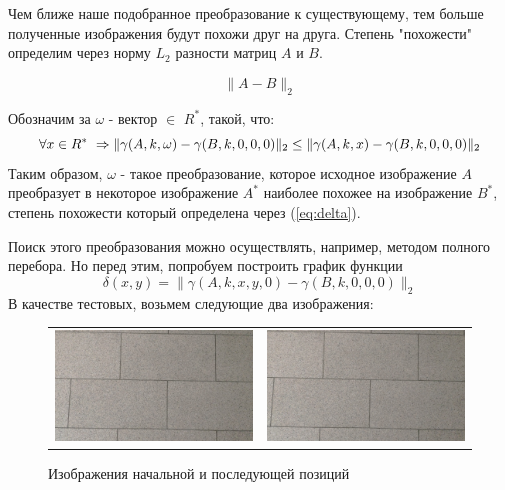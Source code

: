 \documentclass[a4paper,12pt]{article}
\begin{document}
Чем ближе наше подобранное преобразование к существующему, тем больше полученные изображения будут похожи друг на друга. Степень "похожести"  определим через норму $L_2$ разности матриц $A$ и $B$.

\begin{equation}
    \|A-B\|_2
    \label{eq:delta}
\end{equation}

Обозначим за $\omega$ - вектор $\in$ $R^*$, такой, что: 
\begin{equation}
    \forall x \in R^*\ \Rightarrow \\ \|\gamma(A,k,\omega)-\gamma(B,k,0,0,0)\|_2 \leq \|\gamma(A,k,x)-\gamma(B,k,0,0,0)\|_2 
\end{equation}
Таким образом, $\omega$ - такое преобразование, которое исходное изображение $A$ преобразует в некоторое изображение $A^*$ наиболее похожее на изображение $B^*$, степень похожести который определена через (\ref{eq:delta}).  

Поиск этого преобразования можно осуществлять, например, методом полного перебора. Но перед этим, попробуем построить график функции 
\begin{equation}
    \delta(x,y)=\|\gamma(A,k,x,y,0)-\gamma(B,k,0,0,0)\|_2
\end{equation}
В качестве тестовых, возьмем следующие два изображения:

\begin{figure}[H]
    \begin{tabular}{cc}
        \includegraphics[width=7cm]{pictures/img1.jpg}
        & 
        \includegraphics[width=7cm]{pictures/img2.jpg}
    \end{tabular}
    \caption{Изображения начальной и последующей позиций}
\end{figure}
\end{document}
